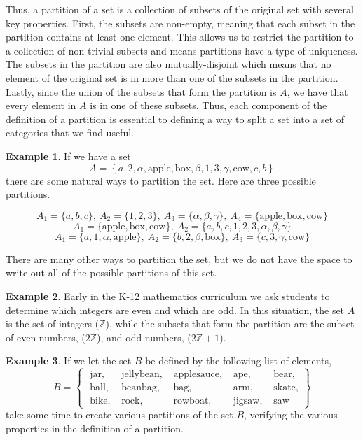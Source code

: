 \documentclass[
]{book}
\theoremstyle{definition}
\theoremstyle{definition}
\newtheorem{example}{Example}[chapter]
\theoremstyle{definition}
\theoremstyle{remark}
\begin{document}
Thus, a partition of a set is a collection of subsets of the original set with several key properties. First, the subsets are non-empty, meaning that each subset in the partition contains at least one element. This allows us to restrict the partition to a collection of non-trivial subsets and means partitions have a type of uniqueness. The subsets in the partition are also mutually-disjoint which means that no element of the original set is in more than one of the subsets in the partition. Lastly, since the union of the subsets that form the partition is \(A\), we have that every element in \(A\) is in one of these subsets. Thus, each component of the definition of a partition is essential to defining a way to split a set into a set of categories that we find useful.

\begin{example}
\protect\hypertarget{exm:unnamed-chunk-40}{}{\label{exm:unnamed-chunk-40} }If we have a set
\[A=\left\{ a, 2, \alpha , \mbox{apple} , \mbox{box}, \beta, 1, 3, \gamma , \mbox{cow}, c, b \right\}\] there are some natural ways to partition the set. Here are three possible partitions.

\[
            A_1 = \{a,b,c\}, \:
            A_2 = \{1,2,3\},\: 
            A_3 = \{\alpha, \beta, \gamma\}, \: 
            A_4 = \{\mbox{apple} , \mbox{box}, \mbox{cow}\} 
\]
\[
            A_1 = \{\mbox{apple} , \mbox{box}, \mbox{cow}\}, \:
            A_2 = \{a,b,c,1,2,3,\alpha,\beta,\gamma\}
\]
\[
            A_1 = \{a,1,\alpha,\mbox{apple}\}, \: 
            A_2 = \{b,2,\beta,\mbox{box}\}, \: 
            A_3 = \{c,3,\gamma, \mbox{cow} \}
\]

There are many other ways to partition the set, but we do not have the space to write out all of the possible partitions of this set.
\end{example}

\begin{example}
\protect\hypertarget{exm:unnamed-chunk-41}{}{\label{exm:unnamed-chunk-41} } Early in the K-12 mathematics curriculum we ask students to determine which integers are even and which are odd. In this situation, the set \(A\) is the set of integers (\(\mathbb{Z}\)), while the subsets that form the partition are the subset of even numbers, (\(2\mathbb{Z}\)), and odd numbers, (\(2\mathbb{Z}+1\)).
\end{example}

\begin{example}
\protect\hypertarget{exm:unnamed-chunk-42}{}{\label{exm:unnamed-chunk-42} }If we let the set \(B\) be defined by the following list of elements,
\[B = \begin{Bmatrix} 
\mbox{ jar},  & \mbox{ jellybean} ,  & \mbox{ applesauce}, & \mbox{ ape}, & \mbox{ bear}, \\
\mbox{ ball}, & \mbox{ beanbag}, & \mbox{ bag}, & \mbox{ arm} , & \mbox{ skate} , \\
\mbox{ bike}, & \mbox{ rock}, & \mbox{ rowboat},   &  \mbox{ jigsaw}, & \mbox{ saw}
 \end{Bmatrix}\]
take some time to create various partitions of the set \(B\), verifying the various properties in the definition of a partition.
\end{example}
\end{document}
